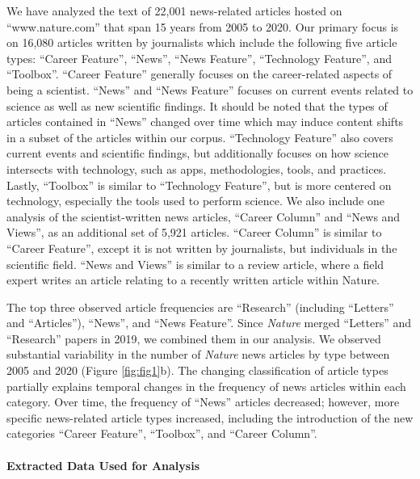 We have analyzed the text of 22,001 news-related articles hosted on ``www.nature.com'' that span 15 years from 2005 to 2020.
Our primary focus is on 16,080 articles written by journalists which include the following five article types: ``Career Feature'', ``News'', ``News Feature'', ``Technology Feature'', and ``Toolbox''.
``Career Feature'' generally focuses on the career-related aspects of being a scientist.
``News'' and ``News Feature'' focuses on current events related to science as well as new scientific findings.
It should be noted that the types of articles contained in ``News'' changed over time which may induce content shifts in a subset of the articles within our corpus.
``Technology Feature'' also covers current events and scientific findings, but additionally focuses on how science intersects with technology, such as apps, methodologies, tools, and practices.
Lastly, ``Toolbox'' is similar to ``Technology Feature'', but is more centered on technology, especially the tools used to perform science.
We also include one analysis of the scientist-written news articles, ``Career Column'' and ``News and Views'', as an additional set of 5,921 articles.
``Career Column'' is similar to ``Career Feature'', except it is not written by journalists, but individuals in the scientific field.
``News and Views'' is similar to a review article, where a field expert writes an article relating to a recently written article within Nature.

The top three observed article frequencies are ``Research'' (including ``Letters'' and ``Articles''), ``News'', and ``News Feature''.
Since \emph{Nature} merged ``Letters'' and ``Research'' papers in 2019, we combined them in our analysis.
We observed substantial variability in the number of \emph{Nature} news articles by type between 2005 and 2020 (Figure \ref{fig:fig1}b).
The changing classification of article types partially explains temporal changes in the frequency of news articles within each category.
Over time, the frequency of ``News'' articles decreased; however, more specific news-related article types increased, including the introduction of the new categories ``Career Feature'', ``Toolbox'', and ``Career Column''.

\hypertarget{extracted-data-used-for-analysis}{%
\paragraph{Extracted Data Used for Analysis}\label{extracted-data-used-for-analysis}}

